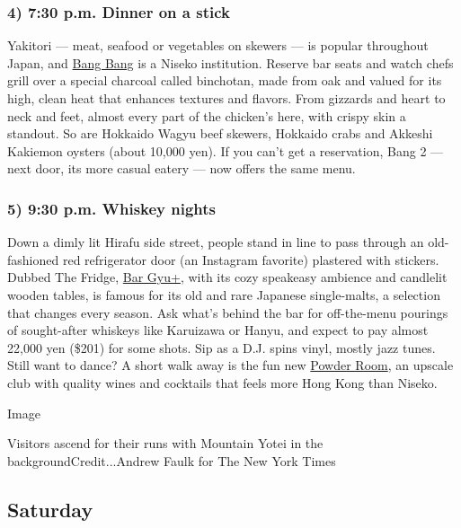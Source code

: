 \hypertarget{4-730-pm-dinner-on-a-stick}{%
\subsubsection{4) 7:30 p.m. Dinner on a
stick}\label{4-730-pm-dinner-on-a-stick}}

Yakitori --- meat, seafood or vegetables on skewers --- is popular
throughout Japan, and \href{http://nisekobangbang.com}{Bang Bang} is a
Niseko institution. Reserve bar seats and watch chefs grill over a
special charcoal called binchotan, made from oak and valued for its
high, clean heat that enhances textures and flavors. From gizzards and
heart to neck and feet, almost every part of the chicken's here, with
crispy skin a standout. So are Hokkaido Wagyu beef skewers, Hokkaido
crabs and Akkeshi Kakiemon oysters (about 10,000 yen). If you can't get
a reservation, Bang 2 --- next door, its more casual eatery --- now
offers the same menu.

\hypertarget{5-930-pm-whiskey-nights}{%
\subsubsection{5) 9:30 p.m. Whiskey
nights}\label{5-930-pm-whiskey-nights}}

Down a dimly lit Hirafu side street, people stand in line to pass
through an old-fashioned red refrigerator door (an Instagram favorite)
plastered with stickers. Dubbed The Fridge, \href{http://gyubar.com}{Bar
Gyu+}, with its cozy speakeasy ambience and candlelit wooden tables, is
famous for its old and rare Japanese single-malts, a selection that
changes every season. Ask what's behind the bar for off-the-menu
pourings of sought-after whiskeys like Karuizawa or Hanyu, and expect to
pay almost 22,000 yen (\$201) for some shots. Sip as a D.J. spins vinyl,
mostly jazz tunes. Still want to dance? A short walk away is the fun new
\href{http://www.powderroomniseko.com/}{Powder Room}, an upscale club
with quality wines and cocktails that feels more Hong Kong than Niseko.

Image

Visitors ascend for their runs with Mountain Yotei in the
backgroundCredit...Andrew Faulk for The New York Times

\hypertarget{saturday}{%
\subsection{Saturday}\label{saturday}}

